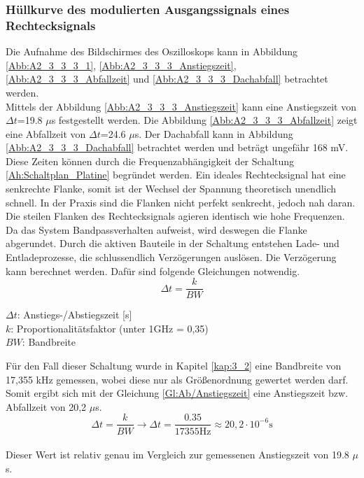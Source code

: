 \documentclass[12pt]{scrartcl}
\begin{document}
\subsubsection{Hüllkurve des modulierten Ausgangssignals eines Rechtecksignals}
Die Aufnahme des Bildschirmes des Oszilloskops kann in Abbildung \ref{Abb:A2_3_3_3_1}, \ref{Abb:A2_3_3_3_Anstiegszeit}, \ref{Abb:A2_3_3_3_Abfallzeit} und \ref{Abb:A2_3_3_3_Dachabfall} betrachtet werden.\\
Mittels der Abbildung \ref{Abb:A2_3_3_3_Anstiegszeit} kann eine Anstiegszeit von $\Delta t$=19.8 $\mu$s festgestellt werden.
Die Abbildung \ref{Abb:A2_3_3_3_Abfallzeit} zeigt eine Abfallzeit von $\Delta t$=24.6 $\mu$s.
Der Dachabfall kann in Abbildung \ref{Abb:A2_3_3_3_Dachabfall} betrachtet werden und beträgt ungefähr 168 mV.\\
Diese Zeiten können durch die Frequenzabhängigkeit der Schaltung \ref{Ah:Schaltplan_Platine} begründet werden.
Ein ideales Rechtecksignal hat eine senkrechte Flanke, somit ist der Wechsel der Spannung theoretisch unendlich schnell.
In der Praxis sind die Flanken nicht perfekt senkrecht, jedoch nah daran.
Die steilen Flanken des Rechtecksignals agieren identisch wie hohe Frequenzen.
Da das System Bandpassverhalten aufweist, wird deswegen die Flanke abgerundet.
Durch die aktiven Bauteile in der Schaltung entstehen Lade- und Entladeprozesse, die schlussendlich Verzögerungen auslösen.
Die Verzögerung kann berechnet werden.
Dafür sind folgende Gleichungen notwendig. \cite{Fluke_Bandbreite} \cite{dataTec_os}
\begin{equation}
    \Delta t = \frac{k}{BW}
    \label{Gl:Ab/Anstiegszeit}
\end{equation}
\begin{center}
    $\Delta t$: Anstiegs-/Abstiegszeit [s]\\
    $k$: Proportionalitätsfaktor (unter 1GHz = 0,35)\\
    $BW$: Bandbreite
\end{center}
Für den Fall dieser Schaltung wurde in Kapitel \ref{kap:3_2} eine Bandbreite von 17,355 kHz gemessen, wobei diese nur als Größenordnung gewertet werden darf.
Somit ergibt sich mit der Gleichung \ref{Gl:Ab/Anstiegszeit} eine Anstiegszeit bzw. Abfallzeit von 20,2 $\mu$s.
\begin{equation*}
        \Delta t = \frac{k}{BW} \rightarrow     \Delta t = \frac{0.35}{17355\text{Hz}} \approx 20,2 \cdot 10^{-6} \text{s}
\end{equation*}\\
Dieser Wert ist relativ genau im Vergleich zur gemessenen Anstiegszeit von 19.8 $\mu$s.
\end{document}
